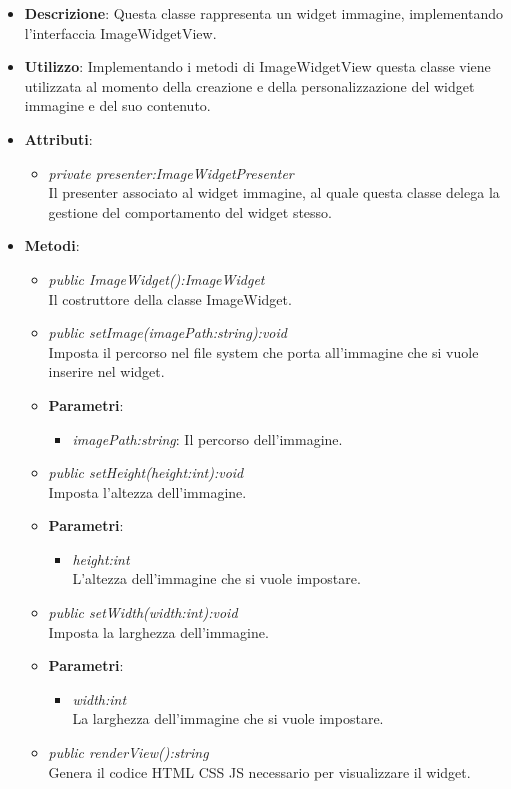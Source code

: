 \begin{itemize}
\item \textbf{Descrizione}: Questa classe rappresenta un widget immagine, implementando l'interfaccia ImageWidgetView.
\item \textbf{Utilizzo}: Implementando i metodi di ImageWidgetView questa classe viene utilizzata al momento della creazione e della personalizzazione del widget immagine e del suo contenuto.
\item \textbf{Attributi}:
	\begin{itemize}
	\item \textit{private presenter:ImageWidgetPresenter}\\
	Il presenter associato al widget immagine, al quale questa classe delega la gestione del comportamento del widget stesso.
	\end{itemize}
\item \textbf{Metodi}:
	\begin{itemize}
	\item \textit{public ImageWidget():ImageWidget}\\
	Il costruttore della classe ImageWidget.
	\item \textit{public setImage(imagePath:string):void}\\
	Imposta il percorso nel file system che porta all'immagine che si vuole inserire nel widget.
		\item{\textbf{Parametri}: \begin{itemize}
		\item \textit{imagePath:string}: Il percorso dell'immagine.
		\end{itemize}}
	\item \textit{public setHeight(height:int):void}\\
	Imposta l'altezza dell'immagine.
		\item{\textbf{Parametri}: \begin{itemize}
		\item \textit{height:int}\\
		L'altezza dell'immagine che si vuole impostare.
		\end{itemize}}
	\item \textit{public setWidth(width:int):void}\\
	Imposta la larghezza dell'immagine.
		\item{\textbf{Parametri}: \begin{itemize}
		\item \textit{width:int}\\
		La larghezza dell'immagine che si vuole impostare.
		\end{itemize}}
	\item \textit{public renderView():string}\\
	Genera il codice HTML CSS JS necessario per visualizzare il widget.
	\end{itemize}
\end{itemize}

